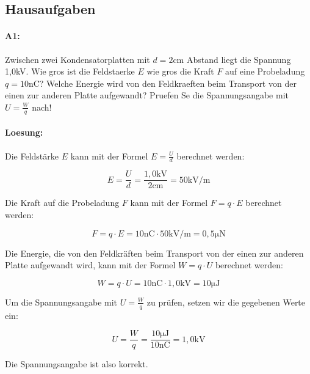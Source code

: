 \documentclass{report}
\begin{document}
\begin{tcolorbox}[colback=gray!10!white,colframe=gray!80!black]
  \subsection{Hausaufgaben} \paragraph{A1:} 
  Zwischen zwei Kondensatorplatten mit $d=2$cm Abstand liegt die Spannung
  1,0kV. Wie gros ist die Feldstaerke $E$ wie gros die Kraft $F$ auf eine
  Probeladung $q=10$nC? Welche Energie wird von den Feldkraeften beim Transport
  von der einen zur anderen Platte aufgewandt? Pruefen Se die Spannungsangabe
  mit $U=\frac{W}{q}$ nach!



\paragraph{Loesung:}
Die Feldstärke $E$ kann mit der Formel $E=\frac{U}{d}$ berechnet werden:

\begin{equation*}
    E=\frac{U}{d}=\frac{1,0\mathrm{kV}}{2\mathrm{cm}}=50\mathrm{kV/m}
\end{equation*}

Die Kraft auf die Probeladung $F$ kann mit der Formel $F=q\cdot E$ berechnet werden:

\begin{equation*}
    F=q\cdot E=10\mathrm{nC}\cdot 50\mathrm{kV/m}=0,5\mathrm{\mu N}
\end{equation*}

Die Energie, die von den Feldkräften beim Transport von der einen zur anderen
Platte aufgewandt wird, kann mit der Formel $W=q\cdot U$ berechnet werden:

\begin{equation*}
    W=q\cdot U=10\mathrm{nC}\cdot 1,0\mathrm{kV}=10\mathrm{\mu J}
\end{equation*}

Um die Spannungsangabe mit $U=\frac{W}{q}$ zu prüfen, setzen wir die gegebenen Werte ein:

\begin{equation*}
    U=\frac{W}{q}=\frac{10\mathrm{\mu J}}{10\mathrm{nC}}=1,0\mathrm{kV}
\end{equation*}

Die Spannungsangabe ist also korrekt.
\end{tcolorbox}
\end{document}
